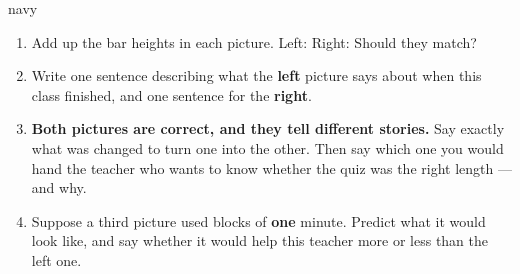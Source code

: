 \documentclass[12pt]{article}
\newcommand{\answerspace}[2]{\par\nopagebreak\noindent\begin{minipage}[t][#1][t]{\linewidth}%
  \color{keyred}\bfseries #2\end{minipage}\par}
\begin{document}
\begin{scenariobox}{navy}
\normalsize
\begin{enumerate}[label=\textbf{\alph*.}, leftmargin=1.8em, itemsep=6pt]
  \item Add up the bar heights in each picture. Left: \blank{1.8cm} \quad
        Right: \blank{1.8cm} \quad Should they match? \blank{2.0cm}
  \item Write one sentence describing what the \textbf{left} picture says about when this class
        finished, and one sentence for the \textbf{right}.
        \answerspace{2.2cm}{}
  \item \textbf{Both pictures are correct, and they tell different stories.} Say exactly what
        was changed to turn one into the other. Then say which one you would hand the teacher
        who wants to know whether the quiz was the right length --- and why.
        \answerspace{2.6cm}{}
  \item Suppose a third picture used blocks of \textbf{one} minute. Predict what it would look
        like, and say whether it would help this teacher more or less than the left one.
        \answerspace{2.0cm}{}
\end{enumerate}
\end{scenariobox}
\end{document}
